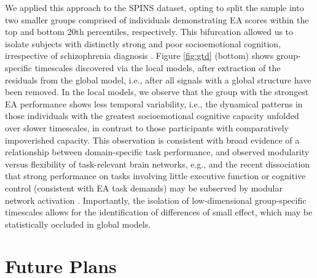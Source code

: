We applied this approach to the SPINS dataset, opting to split the sample into two smaller groups comprised of individuals demonstrating EA scores within the top and bottom 20th percentiles, respectively. This bifurcation allowed us to isolate subjects with distinctly strong and poor socioemotional cognition, irrespective of schizophrenia diagnosis \cite{insel2014nimh}. Figure \ref{fig:gtd} (bottom) shows group-specific timescales discovered via the local models, after extraction of the residuals from the global model, i.e., after all signals with a global structure have been removed. In the local models, we observe that the group with the strongest EA performance shows less temporal variability, i.e., the dynamical patterns in those individuals with the greatest socioemotional cognitive capacity unfolded over slower timescales, in contrast to those participants with comparatively impoverished capacity. This observation is consistent with broad evidence of a relationship between domain-specific task performance, and observed modularity versus flexibility of task-relevant brain networks, e.g.\cite{olsen2013functional}, and the recent dissociation that strong performance on tasks involving little executive function or cognitive control (consistent with EA task demands) may be subserved by modular network activation \cite{ramos2017static}. Importantly, the isolation of low-dimensional group-specific timescales allows for the identification of differences of small effect, which may be statistically occluded in global models. 




\section{Future Plans}